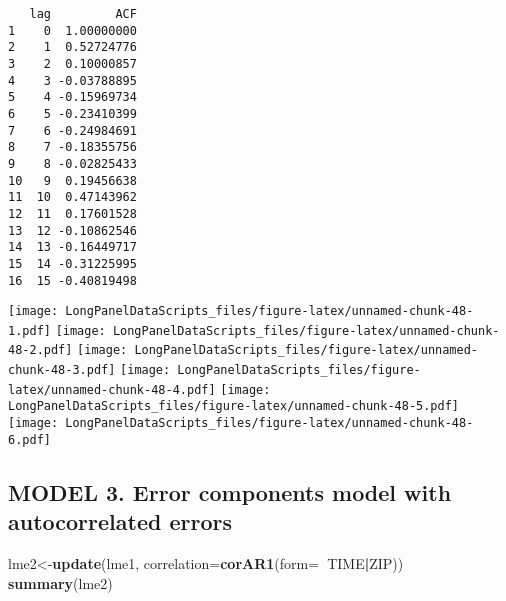 \documentclass[]{book}
\newenvironment{Shaded}{\begin{snugshade}}{\end{snugshade}}
\newcommand{\CommentTok}[1]{\textcolor[rgb]{0.56,0.35,0.01}{\textit{#1}}}
\newcommand{\DataTypeTok}[1]{\textcolor[rgb]{0.13,0.29,0.53}{#1}}
\newcommand{\DecValTok}[1]{\textcolor[rgb]{0.00,0.00,0.81}{#1}}
\newcommand{\KeywordTok}[1]{\textcolor[rgb]{0.13,0.29,0.53}{\textbf{#1}}}
\newcommand{\NormalTok}[1]{#1}
\newcommand{\OperatorTok}[1]{\textcolor[rgb]{0.81,0.36,0.00}{\textbf{#1}}}
\begin{document}
\begin{verbatim}
   lag         ACF
1    0  1.00000000
2    1  0.52724776
3    2  0.10000857
4    3 -0.03788895
5    4 -0.15969734
6    5 -0.23410399
7    6 -0.24984691
8    7 -0.18355756
9    8 -0.02825433
10   9  0.19456638
11  10  0.47143962
12  11  0.17601528
13  12 -0.10862546
14  13 -0.16449717
15  14 -0.31225995
16  15 -0.40819498
\end{verbatim}

\begin{Shaded}
\end{Shaded}

\texttt{[image: LongPanelDataScripts\_files/figure-latex/unnamed-chunk-48-1.pdf]} \texttt{[image: LongPanelDataScripts\_files/figure-latex/unnamed-chunk-48-2.pdf]} \texttt{[image: LongPanelDataScripts\_files/figure-latex/unnamed-chunk-48-3.pdf]} \texttt{[image: LongPanelDataScripts\_files/figure-latex/unnamed-chunk-48-4.pdf]} \texttt{[image: LongPanelDataScripts\_files/figure-latex/unnamed-chunk-48-5.pdf]} \texttt{[image: LongPanelDataScripts\_files/figure-latex/unnamed-chunk-48-6.pdf]}

\hypertarget{model-3.-error-components-model-with-autocorrelated-errors}{%
\subsection{MODEL 3. Error components model with autocorrelated errors}\label{model-3.-error-components-model-with-autocorrelated-errors}}

\begin{Shaded}
\begin{Highlighting}[]
\NormalTok{lme2<-}\KeywordTok{update}\NormalTok{(lme1, }\DataTypeTok{correlation=}\KeywordTok{corAR1}\NormalTok{(}\DataTypeTok{form=}\OperatorTok{~}\NormalTok{TIME}\OperatorTok{|}\NormalTok{ZIP))}
\KeywordTok{summary}\NormalTok{(lme2)}
\end{Highlighting}
\end{Shaded}
\end{document}
